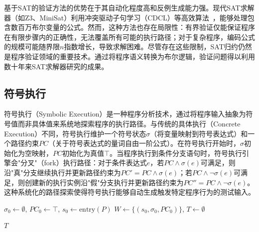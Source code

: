     基于SAT的验证方法的优势在于其自动化程度高和反例生成能力强。现代SAT求解器（如Z3、MiniSat）利用冲突驱动子句学习（CDCL）等高效算法~\cite{serrano2024selfsatisfiedendtoendframeworksat}，能够处理包含数百万布尔变量的公式。然而，这种方法也存在局限性：有界验证仅能保证程序在有限步骤内的正确性，无法覆盖所有可能的执行路径；对于复杂程序，编码公式的规模可能随界限$n$指数增长，导致求解困难。尽管存在这些限制，SAT归约仍然是程序验证领域的重要技术。通过将程序语义转换为布尔逻辑，验证问题得以利用数十年来SAT求解器研究的成果。

\subsection{符号执行}
符号执行（Symbolic Execution）是一种程序分析技术，通过将程序输入抽象为符号值而非具体值来系统地探索程序的执行路径。与传统的具体执行（Concrete Execution）不同，符号执行维护一个符号状态$\sigma$（将变量映射到符号表达式）和一个路径约束$PC$（关于符号表达式的量词自由一阶公式）\cite{10.1007/978-3-540-24730-2_15}。在符号执行开始时，$\sigma$初始化为空映射，$PC$初始化为真值$\top$。当程序执行到条件分支语句时，符号执行引擎会"分叉"（fork）执行路径：对于条件表达式$e$，若$PC \wedge \sigma(e)$可满足，则沿"真"分支继续执行并更新路径约束为$PC' = PC \wedge \sigma(e)$；若$PC \wedge \neg\sigma(e)$可满足，则创建新的执行实例沿"假"分支执行并更新路径约束为$PC'' = PC \wedge \neg\sigma(e)$。这种系统化的路径探索使得符号执行能够自动生成触发特定程序行为的测试输入。

\begin{algorithm}[H]
    \SetAlgoLined
    \label{algo:symbolic-execution}
    
    $\sigma_0 \leftarrow \emptyset$, $PC_0 \leftarrow \top$, $s_0 \leftarrow \text{entry}(P)$\;
    $W \leftarrow \{(s_0, \sigma_0, PC_0)\}$, $T \leftarrow \emptyset$\;
    
    \KwRet $T$\;
\end{algorithm}
    
